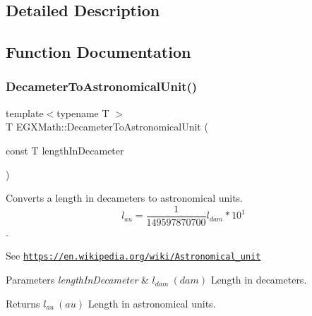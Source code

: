 \subsection{Detailed Description}


\subsection{Function Documentation}
\mbox{\label{group___e_g_x_math-_conversions-_length_conversions-_decameter-_astronomical_ga04365d1ba4f6dc4e7a607d720ccd807b}} 
\subsubsection{\texorpdfstring{Decameter\+To\+Astronomical\+Unit()}{DecameterToAstronomicalUnit()}}
{\footnotesize\ttfamily template$<$typename T $>$ \\
T E\+G\+X\+Math\+::\+Decameter\+To\+Astronomical\+Unit (\begin{DoxyParamCaption}\item[{const T}]{length\+In\+Decameter }\end{DoxyParamCaption})}



Converts a length in decameters to astronomical units. \[ l_{au}= \frac{1}{149597870700} l_{dam} * 10^{1} \]. 

See \href{https://en.wikipedia.org/wiki/Astronomical_unit}{\tt https\+://en.\+wikipedia.\+org/wiki/\+Astronomical\+\_\+unit} 
\begin{DoxyParams}{Parameters}
{\em length\+In\+Decameter} & $ l_{dam}\ (dam)$ Length in decameters. \\
\hline
\end{DoxyParams}
\begin{DoxyReturn}{Returns}
$ l_{au}\ (au)$ Length in astronomical units. 
\end{DoxyReturn}
\mbox{\label{group___e_g_x_math-_conversions-_length_conversions-_decameter-_astronomical_gaf31492b0cfcc0ec057856854376a2ba6}} 
